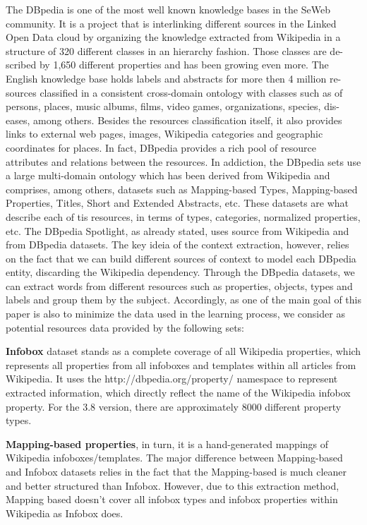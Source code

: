 \documentclass[10pt,a4paper]{article}
\begin{document}
The DBpedia \cite{swj13dbpedia} is one of the most well known knowledge bases in the SeWeb community. It is a project that is interlinking different sources in the Linked Open Data cloud by organizing the knowledge extracted from Wikipedia in a structure of 320 different classes in an hierarchy fashion. Those classes are de- scribed by 1,650 different properties and has been growing even more. The English knowledge base holds labels and abstracts for more then 4 million re- sources classified in a consistent cross-domain ontology with classes such as of persons, places, music albums, films, video games, organizations, species, dis- eases, among others. Besides the resources classification itself, it also provides links to external web pages, images, Wikipedia categories and geographic coordinates for places. In fact, DBpedia provides a rich pool of resource attributes and relations between the resources.
In addiction, the DBpedia sets use a large multi-domain ontology which has been derived from Wikipedia and comprises, among others, datasets such as Mapping-based Types, Mapping-based Properties, Titles, Short and Extended Abstracts, etc. These datasets are what describe each of tis resources, in terms of types, categories, normalized properties, etc. The DBpedia Spotlight, as already stated, uses source from Wikipedia and from DBpedia datasets.
The key ideia of the context extraction, however, relies on the fact that we can build different sources of context to model each DBpedia entity, discarding the Wikipedia dependency. Through the DBpedia datasets, we can extract words from different resources such as properties, objects, types and labels and group them by the subject. Accordingly, as one of the main goal of this paper is also to minimize the data used in the learning process, we consider as potential resources data provided by the following sets:

\textbf{Infobox} dataset stands as a complete coverage of all Wikipedia properties, which represents all properties from all infoboxes and templates within all articles from Wikipedia. It uses the http://dbpedia.org/property/  namespace  to represent extracted information, which directly reflect the name of the Wikipedia infobox property. For the 3.8 version, there are approximately 8000 different property types.

\textbf{Mapping-based properties}, in turn, it is a hand-generated mappings of Wikipedia infoboxes/templates. The major difference between Mapping-based and Infobox datasets relies in the fact that the Mapping-based is much cleaner and better structured than Infobox. However,  due to this extraction method, Mapping based  doesn't cover all infobox types and infobox properties within Wikipedia as Infobox does.
\end{document}
